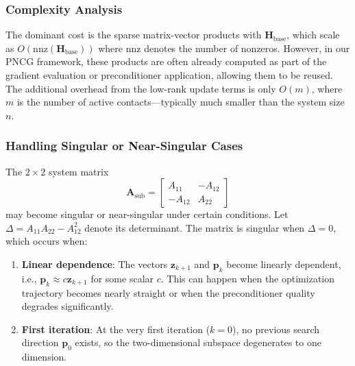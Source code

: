 \documentclass[acmtog,anonymous,review,screen,nonacm]{acmart}
\begin{document}
\subsubsection{Complexity Analysis}
The dominant cost is the sparse matrix-vector products with $\mathbf{H}_{\text{base}}$, which scale as $O(\text{nnz}(\mathbf{H}_{\text{base}}))$ where $\text{nnz}$ denotes the number of nonzeros. However, in our PNCG framework, these products are often already computed as part of the gradient evaluation or preconditioner application, allowing them to be reused. The additional overhead from the low-rank update terms is only $O(m)$, where $m$ is the number of active contacts---typically much smaller than the system size $n$.

\subsubsection{Handling Singular or Near-Singular Cases}
The $2 \times 2$ system matrix
\begin{equation}
    \mathbf{A}_{\text{sub}} = \begin{bmatrix} A_{11} & -A_{12} \\ -A_{12} & A_{22} \end{bmatrix}
\end{equation}
may become singular or near-singular under certain conditions. Let $\Delta = A_{11} A_{22} - A_{12}^2$ denote its determinant. The matrix is singular when $\Delta = 0$, which occurs when:
\begin{enumerate}
    \item \textbf{Linear dependence}: The vectors $\mathbf{z}_{k+1}$ and $\mathbf{p}_k$ become linearly dependent, i.e., $\mathbf{p}_k \approx c \mathbf{z}_{k+1}$ for some scalar $c$. This can happen when the optimization trajectory becomes nearly straight or when the preconditioner quality degrades significantly.
    \item \textbf{First iteration}: At the very first iteration ($k=0$), no previous search direction $\mathbf{p}_0$ exists, so the two-dimensional subspace degenerates to one dimension.
\end{enumerate}
\end{document}
